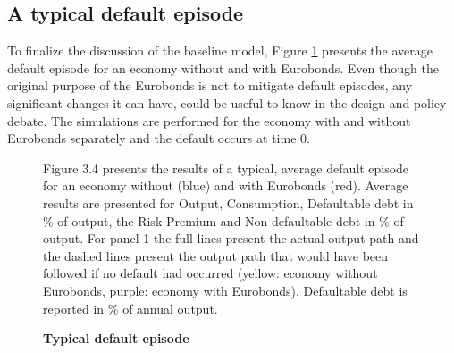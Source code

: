 \subsection{A typical default episode}
To finalize the discussion of the baseline model, Figure \ref{fig:default_episode} presents the average default episode for an economy without and with Eurobonds. Even though the original purpose of the Eurobonds is not to mitigate default episodes, any significant changes it can have, could be useful to know in the design and policy debate. The simulations are performed for the economy with and without Eurobonds separately and the default occurs at time 0.\\
\begin{figure}[H] 
     \centering
     \caption{\textbf{Typical default episode}}
     \vspace{1mm}
      \label{fig:default_episode}
      \begin{tablenotes}
      \footnotesize
      \item Figure 3.4 presents the results of a typical, average default episode for an economy without (blue) and with Eurobonds (red). Average results are presented for Output, Consumption, Defaultable debt in \% of output, the Risk Premium and Non-defaultable debt in \% of output. For panel 1 the full lines present the actual output path and the dashed lines present the output path that would have been followed if no default had occurred (yellow: economy without Eurobonds, purple: economy with Eurobonds). Defaultable debt is reported in \% of annual output.
      \end{tablenotes}
    
 \end{figure}
